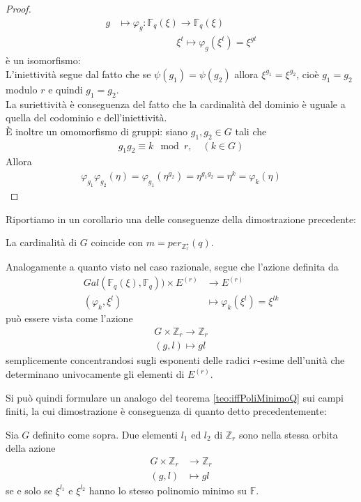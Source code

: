 \begin{proof}
\begin{align*}
			      g &\longmapsto  \varphi_{g} : \mathbb{F}_{q}(\xi)\longrightarrow  \mathbb{F}_{q}(\xi)\\
					  & \quad \qquad \qquad \quad \xi^{t} \longmapsto \varphi_{g}(\xi^{t}) = \xi^{gt}
      \end{align*}
   è un isomorfismo:\\
   L'iniettività segue dal fatto che se $\psi(g_{1})=\psi(g_{2})$ allora $\xi^{g_{1}} = \xi^{g_{2}}$, cioè $g_{1} = g_{2}$ modulo $r$ e quindi $g_{1} = g_{2}$.\\
   La suriettività è conseguenza del fatto che la cardinalità del dominio è uguale a quella del codominio e dell'iniettività.\\
   È inoltre un omomorfismo di gruppi: siano $g_{1}, g_{2} \in G$ tali che
   \begin{align*}
      g_{1} g_{2} \equiv k \mod{r}, \quad (k \in G)
   \end{align*}
   Allora
   \begin{align*}
      \varphi_{g_{1}} \varphi_{g_{2}}(\eta) = \varphi_{g_{1}}(\eta^{g_{2}}) = \eta^{g_{1}g_{2}} = \eta^{k} = \varphi_{k}(\eta)
   \end{align*}
\end{proof}
\noindent
Riportiamo in un corollario una delle conseguenze della dimostrazione precedente:
\begin{corollario}
   La cardinalità di $G$ coincide con $m = per_{\mathbb{Z}_{r}^{\star}}(q)$.
\end{corollario}

Analogamente a quanto visto nel caso razionale, segue che l'azione definita da
\begin{align*}
 Gal(\mathbb{F}_{q}(\xi), \mathbb{F}_{q})) \times E^{(r)}  & \longrightarrow  E^{(r)}   \\
           (\varphi_{k},\xi^{l}) & \longmapsto \varphi_{k}(\xi^{l}) = \xi^{lk}
\end{align*}
può essere vista come l'azione
\begin{align*}
 G \times \mathbb{Z}_{r} \longrightarrow  \mathbb{Z}_{r}   \\
           (g,l) \longmapsto gl
\end{align*}
semplicemente concentrandosi sugli esponenti delle radici $r$-esime dell'unità che determinano univocamente gli elementi di $E^{(r)}$.

Si può quindi formulare un analogo del teorema \ref{teo:iffPoliMinimoQ} sui campi finiti, la cui dimostrazione è conseguenza di quanto detto precedentemente:
\begin{teorema} \label{teo:iffPoliMinimoGF}
Sia $G$ definito come sopra. Due elementi $l_{1}$ ed $l_{2}$ di $\mathbb{Z}_{r}$ sono nella stessa orbita della azione
\begin{align*}
 G \times \mathbb{Z}_{r} &\longrightarrow  \mathbb{Z}_{r}   \\
           (g,l) &\longmapsto gl
\end{align*}
se e solo se $\xi^{l_{1}}$ e $\xi^{l_{2}}$ hanno lo stesso polinomio minimo su $\mathbb{F}$.
\end{teorema}

